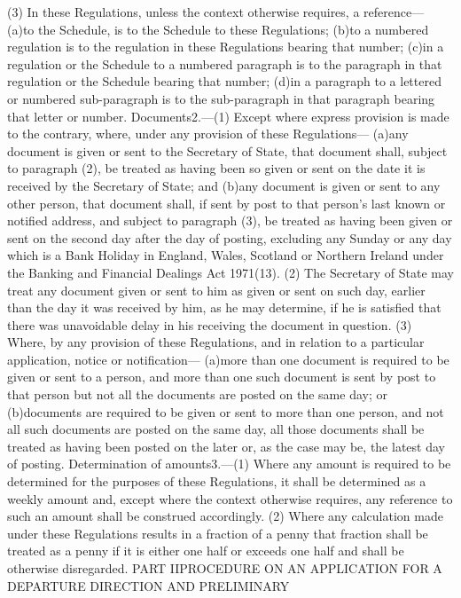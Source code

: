 \documentclass[a4paper]{article}
\begin{document}
(3) In these Regulations, unless the context otherwise requires, a reference—
(a)to the Schedule, is to the Schedule to these Regulations;
(b)to a numbered regulation is to the regulation in these Regulations bearing
that number;
(c)in a regulation or the Schedule to a numbered paragraph is to the paragraph
in that regulation or the Schedule bearing that number;
(d)in a paragraph to a lettered or numbered sub-paragraph is to the
sub-paragraph in that paragraph bearing that letter or number.
Documents2.—(1) Except where express provision is made to the contrary, where,
under any provision of these Regulations—
(a)any document is given or sent to the Secretary of State, that document shall,
subject to paragraph (2), be treated as having been so given or sent on the date
it is received by the Secretary of State; and
(b)any document is given or sent to any other person, that document shall, if
sent by post to that person’s last known or notified address, and subject to
paragraph (3), be treated as having been given or sent on the second day after
the day of posting, excluding any Sunday or any day which is a Bank Holiday in
England, Wales, Scotland or Northern Ireland under the Banking and Financial
Dealings Act 1971(13).
(2) The Secretary of State may treat any document given or sent to him as given
or sent on such day, earlier than the day it was received by him, as he may
determine, if he is satisfied that there was unavoidable delay in his receiving
the document in question.
(3) Where, by any provision of these Regulations, and in relation to a
particular application, notice or notification—
(a)more than one document is required to be given or sent to a person, and more
than one such document is sent by post to that person but not all the documents
are posted on the same day; or
(b)documents are required to be given or sent to more than one person, and not
all such documents are posted on the same day,
all those documents shall be treated as having been posted on the later or, as
the case may be, the latest day of posting.
Determination of amounts3.—(1) Where any amount is required to be determined for
the purposes of these Regulations, it shall be determined as a weekly amount
and, except where the context otherwise requires, any reference to such an
amount shall be construed accordingly.
(2) Where any calculation made under these Regulations results in a fraction of
a penny that fraction shall be treated as a penny if it is either one half or
exceeds one half and shall be otherwise disregarded.
PART IIPROCEDURE ON AN APPLICATION FOR A DEPARTURE DIRECTION AND PRELIMINARY
\end{document}
